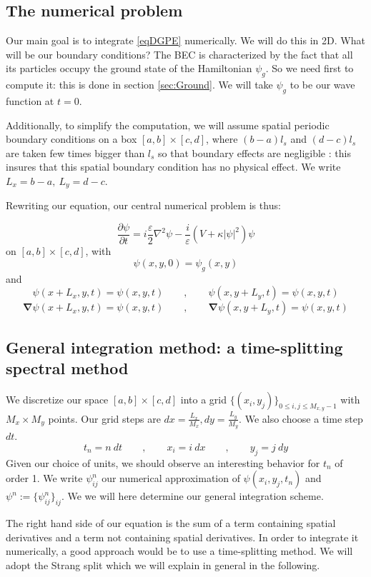 \documentclass{article}
\begin{document}
\subsection{The numerical problem}
Our main goal is to integrate \eqref{eqDGPE} numerically. We will do this in 2D. What will be our boundary conditions? The BEC is characterized by the fact that all its particles occupy the ground state of the Hamiltonian $\psi_g$. So we need first to compute it: this is done in section \ref{sec:Ground}. We will take $\psi_g$ to be our wave function at $t=0$. \par
Additionally, to simplify the computation, we will assume spatial periodic boundary conditions on a box $\left[a,b\right]\times\left[c,d\right]$, where $(b-a)l_s$ and $(d-c)l_s$ are taken few times bigger than $l_s$ so that boundary effects are negligible : this insures that this spatial boundary condition has no physical effect. We write $L_x=b-a,~L_y=d-c$.

\bigskip
Rewriting our equation, our central numerical problem is thus:
\begin{framed}
$$
\frac{\partial \psi}{\partial t}=i\frac{\varepsilon}{2} \nabla^{2} \psi-\frac{i}{\varepsilon}\left(V +\kappa|\psi|^{2}\right) \psi
$$
on $\left[a,b\right]\times\left[c,d\right]$, with
$$
\psi(x,y,0)=\psi_g(x,y)
$$
and
$$
\psi(x+L_x,y,t)=\psi(x,y,t)\qquad,\qquad \psi(x,y+L_y,t)=\psi(x,y,t)
$$
$$
\boldsymbol{\nabla}\psi(x+L_x,y,t)=\psi(x,y,t)\qquad,\qquad \boldsymbol{\nabla}\psi(x,y+L_y,t)=\psi(x,y,t) 
$$
\end{framed}



\subsection{General integration method: a time-splitting spectral method}
We discretize our space $\left[a,b\right]\times\left[c,d\right]$ into a grid $\{(x_i,y_j)\}_{0\leq i,j\leq M_{x,y}-1}$ with $M_x\times M_y$ points. Our grid steps are $dx=\frac{L_x}{M_x}, dy=\frac{L_y}{M_y}$. We also choose a time step $dt$.
$$
t_n=n~dt\qquad,\qquad x_i= i~dx\qquad,\qquad y_j= j~dy
$$
Given our choice of units, we should observe an interesting behavior for $t_n$ of order 1. We write $\psi^n_{ij}$ our numerical approximation of $\psi(x_i,y_j,t_n)$ and $\psi^n:=\{\psi^n_{ij}\}_{ij}$. We we will here determine our general integration scheme.

\bigskip
The right hand side of our equation is the sum of a term containing spatial derivatives and a term not containing spatial derivatives. In order to integrate it numerically, a good approach would be to use a time-splitting method. We will adopt the Strang split which we will explain in general in the following.
\end{document}
